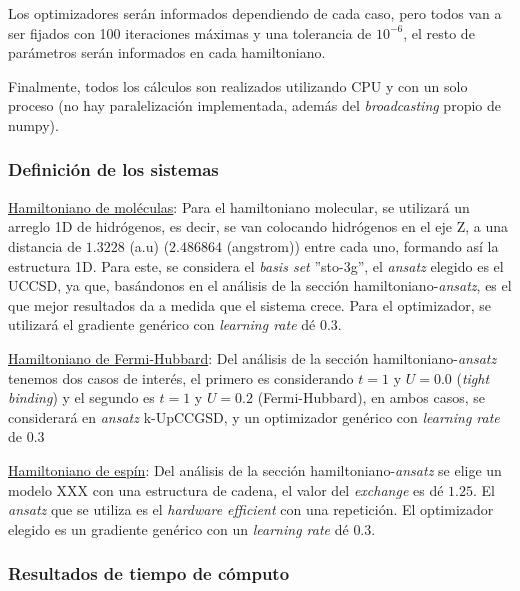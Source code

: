 Los optimizadores serán informados dependiendo de cada caso, pero todos van a ser fijados con 100 iteraciones máximas y una tolerancia de $10^{-6}$, el resto de parámetros serán informados en cada hamiltoniano.

Finalmente, todos los cálculos son realizados utilizando CPU y con un solo proceso (no hay paralelización implementada, además del \textit{broadcasting} propio de numpy).

\subsubsection{Definición de los sistemas}

\underline{Hamiltoniano de moléculas}: 
Para el hamiltoniano molecular, se utilizará un arreglo 1D de hidrógenos, es decir, se van colocando hidrógenos en el eje Z, a una distancia de $1.3228$ (a.u) ($2.486864$ (angstrom)) entre cada uno, formando así la estructura 1D. Para este, se considera el \textit{basis set} ''sto-3g'', el \textit{ansatz} elegido es el UCCSD, ya que, basándonos en el análisis de la sección hamiltoniano-\textit{ansatz}, es el que mejor resultados da a medida que el sistema crece. Para el optimizador, se utilizará el gradiente genérico con \textit{learning rate} dé $0.3$.


\underline{Hamiltoniano de Fermi-Hubbard}: 
Del análisis de la sección hamiltoniano-\textit{ansatz} tenemos dos casos de interés, el primero es considerando $t=1$ y $U=0.0$ (\textit{tight binding}) y el segundo es $t=1$ y $U=0.2$ (Fermi-Hubbard), en ambos casos, se considerará en \textit{ansatz} k-UpCCGSD, y un optimizador genérico con \textit{learning rate} de $0.3$


\underline{Hamiltoniano de espín}: 
Del análisis de la sección hamiltoniano-\textit{ansatz} se elige un modelo XXX con una estructura de cadena, el valor del \textit{exchange} es dé $1.25$. El \textit{ansatz} que se utiliza es el \textit{hardware efficient} con una repetición. El optimizador elegido es un gradiente genérico con un \textit{learning rate} dé $0.3$.


\subsubsection{Resultados de tiempo de cómputo}

